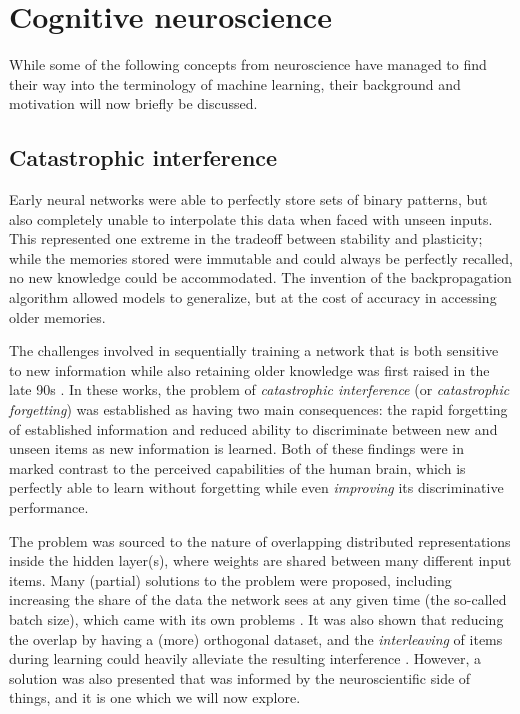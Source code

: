 \documentclass[11pt]{article}
\theoremstyle{remark}
\begin{document}

\section{Cognitive neuroscience}

While some of the following concepts from neuroscience have managed to find their way into the terminology of machine learning, their background and motivation will now briefly be discussed.

\subsection{Catastrophic interference}

Early neural networks were able to perfectly store sets of binary patterns, but also completely unable to interpolate this data when faced with unseen inputs. This represented one extreme in the tradeoff between stability and plasticity; while the memories stored were immutable and could always be perfectly recalled, no new knowledge could be accommodated.  The invention of the backpropagation algorithm allowed models to generalize, but at the cost of accuracy in accessing older memories.

The challenges involved in sequentially training a network that is both sensitive to new information while also retaining older knowledge was first raised in the late 90s \cite{mccloskey1989catastrophic,ratcliff1990connectionist}. In these works, the problem of \textit{catastrophic interference} (or \textit{catastrophic forgetting}) was established as having two main consequences: the rapid forgetting of established information and reduced ability to discriminate between new and unseen items as new information is learned. Both of these findings were in marked contrast to the perceived capabilities of the human brain, which is perfectly able to learn without forgetting while even \textit{improving} its discriminative performance.

The problem was sourced to the nature of overlapping distributed representations inside the hidden layer(s), where weights are shared between many different input items. Many (partial) solutions to the problem were proposed, including increasing the share of the data the network sees at any given time (the so-called batch size), which came with its own problems \cite{keskar2016on}. It was also shown that reducing the overlap by having a (more) orthogonal dataset, and the \textit{interleaving} of items during learning could heavily alleviate the resulting interference \cite{mcclelland2020integration}. However, a solution was also presented that was informed by the neuroscientific side of things, and it is one which we will now explore.
\end{document}
